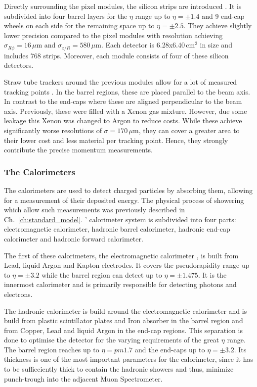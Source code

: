 \documentclass[bachelor,ngerman,english]{GAUBM}
\begin{document}
Directly surrounding the pixel modules, the silicon strips are introduced \cite{atlas:tech_design_report_01,atlas:strip_detector}. It is subdivided into four barrel layers for the $\eta$ range up to $\eta=\pm1.4$ and 9 end-cap wheels on each side for the remaining space up to $\eta=\pm2.5$. They achieve slightly lower precision compared to the pixel modules with resolution achieving $\sigma_{R\phi}=16\,\mu\text{m}$ and $\sigma_{z/R}=580\,\mu\text{m}$. Each detector is 6.28x6.40\,cm$^2$ in size and includes 768 strips. Moreover, each module consists of four of these silicon detectors.

Straw tube trackers around the previous modules allow for a lot of measured tracking points \cite{atlas:tech_design_report_01,atlas:transition_detector}. In the barrel regions, these are placed parallel to the beam axis. In contrast to the end-caps where these are aligned perpendicular to the beam axis. Previously, these were filled with a Xenon gas mixture. However, due some leakage this Xenon was changed to Argon to reduce costs. While these achieve significantly worse resolutions of $\sigma=170\,\mu\text{m}$, they can cover a greater area to their lower cost and less material per tracking point. Hence, they strongly contribute the precise momentum measurements.

\subsubsection*{The Calorimeters}
The calorimeters \cite{atlas:tech_design_report_01,atlas:calorimeter} are used to detect charged particles by absorbing them, allowing for a measurement of their deposited energy. The physical process of showering which allow such measurements was previously described in Ch.~\ref{ch:standard_model}. \atlas' calorimeter system is subdivided into four parts: electromagnetic calorimeter, hadronic barrel calorimeter, hadronic end-cap calorimeter and hadronic forward calorimeter.

The first of these calorimeters, the electromagnetic calorimeter \cite{atlas:tech_design_report_01}, is built from Lead, liquid Argon and Kapton electrodes. It covers the pseudorapidity range up to $\eta=\pm3.2$ while the barrel region can detect up to $\eta=\pm1.475$. It is the innermost calorimeter and is primarily responsible for detecting photons and electrons. 

The hadronic calorimeter \cite{atlas:tech_design_report_01} is build around the electromagnetic calorimeter and is build from plastic scintillator plates and Iron absorber in the barrel region and from Copper, Lead and liquid Argon in the end-cap regions. This separation is done to optimise the detector for the varying requirements of the great $\eta$ range. The barrel region reaches up to $\eta=pm1.7$ and the end-caps up to $\eta=\pm3.2$. Its thickness is one of the most important parameters for the calorimeter, since it has to be suffieciently thick to contain the hadronic showers and thus, minimize punch-trough into the adjacent Muon Spectrometer.
\end{document}
